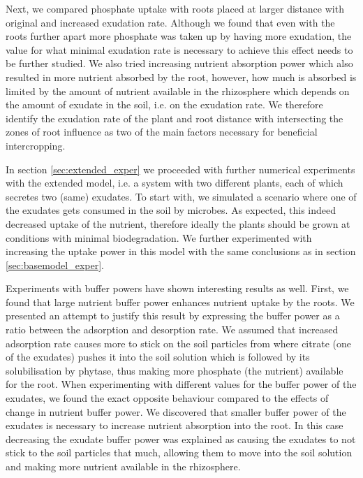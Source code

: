 \documentclass[11pt]{article}
\numberwithin{equation}{section}
\begin{document}
Next, we compared phosphate uptake with roots placed at larger distance with original and increased exudation rate. Although we found that even with the roots further apart more phosphate was taken up by having more exudation, the value for what minimal exudation rate is necessary to achieve this effect needs to be further studied. We also tried increasing nutrient absorption power which also resulted in more nutrient absorbed by the root, however, how much is absorbed is limited by the amount of nutrient available in the rhizosphere which depends on the amount of exudate in the soil, i.e. on the exudation rate. We therefore identify the exudation rate of the plant and root distance with intersecting the zones of root influence as two of the main factors necessary for beneficial intercropping.

In section \ref{sec:extended_exper} we proceeded with further numerical experiments with the extended model, i.e. a system with two different plants, each of which secretes two (same) exudates. To start with, we simulated a scenario where one of the exudates gets consumed in the soil by microbes. As expected, this indeed decreased uptake of the nutrient, therefore ideally the plants should be grown at conditions with minimal biodegradation.
We further experimented with increasing the uptake power in this model with the same conclusions as in section \ref{sec:basemodel_exper}.

Experiments with buffer powers have shown interesting results as well. First, we found that large nutrient buffer power enhances nutrient uptake by the roots. We presented an attempt to justify this result by expressing the buffer power as a ratio between the adsorption and desorption rate. We assumed that increased adsorption rate causes more  to stick on the soil particles from where citrate (one of the exudates) pushes it into the soil solution which is followed by its solubilisation by phytase, thus making more phosphate (the nutrient) available for the root. When experimenting with different values for the buffer power of the exudates, we found the exact opposite behaviour compared to the effects of change in nutrient buffer power. We discovered that smaller buffer power of the exudates is necessary to increase nutrient absorption into the root. In this case decreasing the exudate buffer power was explained as causing the exudates to not stick to the soil particles that much, allowing them to move into the soil solution and making more nutrient available in the rhizosphere.
\end{document}
